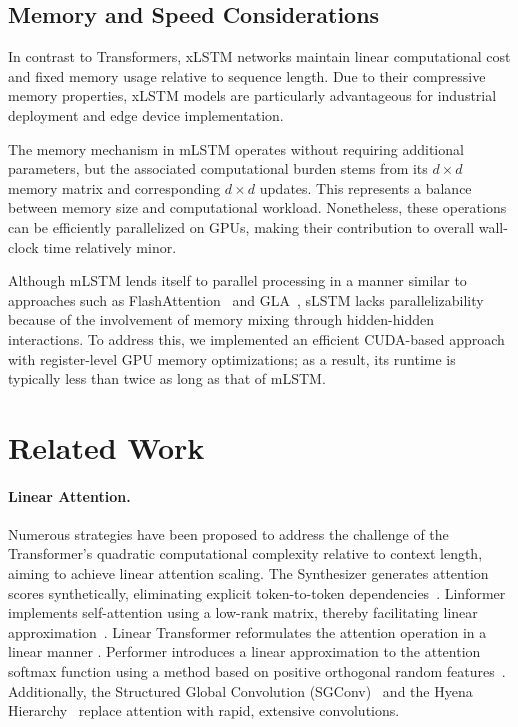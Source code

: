 \subsection{Memory and Speed Considerations}

In contrast to Transformers, xLSTM networks maintain linear computational cost and fixed memory usage relative to sequence length. Due to their compressive memory properties, xLSTM models are particularly advantageous for industrial deployment and edge device implementation.

The memory mechanism in mLSTM operates without requiring additional parameters, but the associated computational burden stems from its $d \times d$ memory matrix and corresponding $d \times d$ updates. This represents a balance between memory size and computational workload. Nonetheless, these operations can be efficiently parallelized on GPUs, making their contribution to overall wall-clock time relatively minor.

Although mLSTM lends itself to parallel processing in a manner similar to approaches such as FlashAttention~\citep{Dao:22,Dao:23} and GLA~\citep{Yang:23arxiv}, sLSTM lacks parallelizability because of the involvement of memory mixing through hidden-hidden interactions. To address this, we implemented an efficient CUDA-based approach with register-level GPU memory optimizations; as a result, its runtime is typically less than twice as long as that of mLSTM.

\section{Related Work}
\label{sec:related}

\paragraph{Linear Attention.} Numerous strategies have been proposed to address the challenge of the Transformer’s quadratic computational complexity relative to context length, aiming to achieve linear attention scaling. The Synthesizer generates attention scores synthetically, eliminating explicit token-to-token dependencies~\citep{Tay:20arxiv}. Linformer implements self-attention using a low-rank matrix, thereby facilitating linear approximation~\citep{Wang:20arxiv}. Linear Transformer reformulates the attention operation in a linear manner \citep{Katharopoulos:20}. Performer introduces a linear approximation to the attention softmax function using a method based on positive orthogonal random features~\citep{Choromanski:21}. Additionally, the Structured Global Convolution (SGConv)~\citep{Li:22} and the Hyena Hierarchy~\citep{Poli:23} replace attention with rapid, extensive convolutions.

